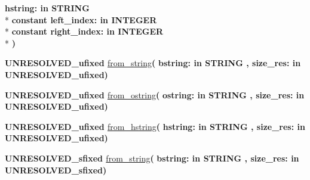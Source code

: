 \begin{DoxyCompactItemize}
{\bfseries \textcolor{vhdlchar}{hstring\+: }\textcolor{stringliteral}{in }{\bfseries \textcolor{comment}{S\+T\+R\+I\+N\+G}\textcolor{vhdlchar}{ }}}\\*
{\bfseries {\bfseries \textcolor{keywordflow}{constant}\textcolor{vhdlchar}{ }}\textcolor{vhdlchar}{left\+\_\+index\+: }\textcolor{stringliteral}{in }{\bfseries \textcolor{comment}{I\+N\+T\+E\+G\+E\+R}\textcolor{vhdlchar}{ }}}\\*
{\bfseries {\bfseries \textcolor{keywordflow}{constant}\textcolor{vhdlchar}{ }}\textcolor{vhdlchar}{right\+\_\+index\+: }\textcolor{stringliteral}{in }{\bfseries \textcolor{comment}{I\+N\+T\+E\+G\+E\+R}\textcolor{vhdlchar}{ }}}\\*
{\bfseries  )} 
\item 
{\bfseries {\bfseries \textcolor{vhdlchar}{U\+N\+R\+E\+S\+O\+L\+V\+E\+D\+\_\+ufixed}\textcolor{vhdlchar}{ }}} \hyperlink{class__fixed__pkg_ab76fd9edde5c322c159dc314164e65e5}{from\+\_\+string}{\bfseries  ( }{\bfseries \textcolor{vhdlchar}{bstring\+: }\textcolor{stringliteral}{in }{\bfseries \textcolor{comment}{S\+T\+R\+I\+N\+G}\textcolor{vhdlchar}{ }}}{\bfseries  , \textcolor{vhdlchar}{size\+\_\+res\+: }\textcolor{stringliteral}{in }\textcolor{vhdlchar}{U\+N\+R\+E\+S\+O\+L\+V\+E\+D\+\_\+ufixed}}{\bfseries  )} 
\item 
{\bfseries {\bfseries \textcolor{vhdlchar}{U\+N\+R\+E\+S\+O\+L\+V\+E\+D\+\_\+ufixed}\textcolor{vhdlchar}{ }}} \hyperlink{class__fixed__pkg_a6d1d9e86789f0f1a451f92f85640396f}{from\+\_\+ostring}{\bfseries  ( }{\bfseries \textcolor{vhdlchar}{ostring\+: }\textcolor{stringliteral}{in }{\bfseries \textcolor{comment}{S\+T\+R\+I\+N\+G}\textcolor{vhdlchar}{ }}}{\bfseries  , \textcolor{vhdlchar}{size\+\_\+res\+: }\textcolor{stringliteral}{in }\textcolor{vhdlchar}{U\+N\+R\+E\+S\+O\+L\+V\+E\+D\+\_\+ufixed}}{\bfseries  )} 
\item 
{\bfseries {\bfseries \textcolor{vhdlchar}{U\+N\+R\+E\+S\+O\+L\+V\+E\+D\+\_\+ufixed}\textcolor{vhdlchar}{ }}} \hyperlink{class__fixed__pkg_a2b290e41375b7067bea0da8031b9d434}{from\+\_\+hstring}{\bfseries  ( }{\bfseries \textcolor{vhdlchar}{hstring\+: }\textcolor{stringliteral}{in }{\bfseries \textcolor{comment}{S\+T\+R\+I\+N\+G}\textcolor{vhdlchar}{ }}}{\bfseries  , \textcolor{vhdlchar}{size\+\_\+res\+: }\textcolor{stringliteral}{in }\textcolor{vhdlchar}{U\+N\+R\+E\+S\+O\+L\+V\+E\+D\+\_\+ufixed}}{\bfseries  )} 
\item 
{\bfseries {\bfseries \textcolor{vhdlchar}{U\+N\+R\+E\+S\+O\+L\+V\+E\+D\+\_\+sfixed}\textcolor{vhdlchar}{ }}} \hyperlink{class__fixed__pkg_a03e4e32f0028050c120a971c541ccde3}{from\+\_\+string}{\bfseries  ( }{\bfseries \textcolor{vhdlchar}{bstring\+: }\textcolor{stringliteral}{in }{\bfseries \textcolor{comment}{S\+T\+R\+I\+N\+G}\textcolor{vhdlchar}{ }}}{\bfseries  , \textcolor{vhdlchar}{size\+\_\+res\+: }\textcolor{stringliteral}{in }\textcolor{vhdlchar}{U\+N\+R\+E\+S\+O\+L\+V\+E\+D\+\_\+sfixed}}{\bfseries  )} 

\end{DoxyCompactItemize}
